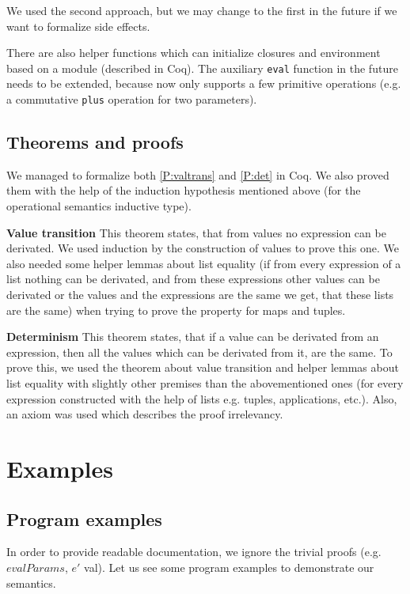 \documentclass[12pt]{article}
\theoremstyle{definition}
\numberwithin{equation}{section}
\begin{document}
We used the second approach, but we may change to the first in the future if we want to formalize side effects.

There are also helper functions which can initialize closures and environment based on a module (described in Coq). The auxiliary \verb|eval| function in the future needs to be extended, because now only supports a few primitive operations (e.g. a commutative \verb|plus| operation for two parameters).

\subsection{Theorems and proofs}

We managed to formalize both \ref{P:valtrans} and \ref{P:det} in Coq. We also proved them with the help of the induction hypothesis mentioned above (for the operational semantics inductive type).

{\bf Value transition} This theorem states, that from values no expression can be derivated. We used induction by the construction of values to prove this one. We also needed some helper lemmas about list equality (if from every expression of a list nothing can be derivated, and from these expressions other values can be derivated or the values and the expressions are the same we get, that these lists are the same) when trying to prove the property for maps and tuples.

{\bf Determinism} This theorem states, that if a value can be derivated from an expression, then all the values which can be derivated from it, are the same. To prove this, we used the theorem about value transition and helper lemmas about list equality with slightly other premises than the abovementioned ones (for every expression constructed with the help of lists e.g. tuples, applications, etc.). Also, an axiom was used which describes the proof irrelevancy.

\section{Examples}

\subsection{Program examples}

In order to provide readable documentation, we ignore the trivial proofs (e.g. $evalParams$, $e'$ val). Let us see some program examples to demonstrate our semantics.
\end{document}
